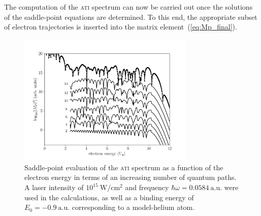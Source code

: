 
The computation of the \textsc{ati} spectrum can now be carried out
once the solutions of the saddle-point equations are determined. To
this end, the appropriate subset of electron trajectories is inserted
into the matrix element~(\ref{eq:Mp_final}).

\begin{figure}
  \centering \includegraphics[width =
    0.75\textwidth]{figures/ch_ATI_SPA/rescattering/14pathsvsqm.pdf}
  \caption{Saddle-point evaluation of the \textsc{ati} spectrum as a
    function of the electron energy in terms of an increasing number
    of quantum paths. A laser intensity of
    $10^{15}\ \mathrm{W/cm^{2}}$ and frequency $\hbar\omega =
    0.0584\ \mathrm{a.u.}$ were used in the calculations, as well as a
    binding energy of $E_{0} = -0.9\ \mathrm{a.u.}$ corresponding to a
    model-helium atom.}
  \label{fig:ati_spectrum}
\end{figure}








